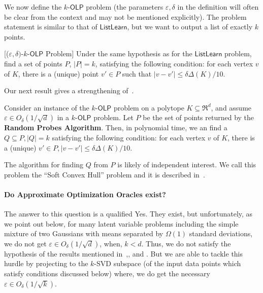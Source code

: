 \documentclass[11pt,letterpaper]{article}
\newcommand{\olp}{{\mathsf {OLP}}\xspace}
\newcommand{\kolp}{k\mbox{-}\olp}
\newcommand{\ListLearn}{\mathsf {ListLearn}\xspace}
\begin{document}
We now define the $\kolp$ problem (the parameters $\varepsilon, \delta$ in the definition will often be clear from the context and may not be mentioned explicitly). The problem statement is similar to that of $\ListLearn$, but we want to output a list of exactly $k$ points. 
\begin{defn}\label{OLP}[($\varepsilon,\delta)$-$\kolp$ Problem]
Under the same hypothesis as for the $\ListLearn$ problem, find  a set of points $P$,  $|P|=k$, satisfying the following condition: for each vertex $v$ of $K$, there is a (unique) point $ v'\in P$ such that  $|v-v'|\leq\delta\Delta(K)/10$.
\end{defn}

Our next result gives a strengthening of~. 
\begin{theorem}\label{kolp-0}
Consider an instance of the $\kolp$ problem on a polytope $K \subseteq \Re^d$, and assume 
$\varepsilon \in O_\delta(1/\sqrt d)$ in a $\kolp$ problem. Let $P$ be the set of points returned by the {\bf Random Probes Algorithm}. Then, in polynomial time, we an find a $Q\subseteq P, |Q|=k$ satisfying the following condition:  for each vertex $v$ of $K$,  there is a (unique) $v'\in P, |v-v'|\leq\delta\Delta(K)/10$.
\end{theorem}

The algorithm for finding $Q$ from $P$ is likely of independent interest. We call this problem the ``Soft Convex Hull'' problem and it is described in~.

\paragraph{Do Approximate Optimization Oracles exist?}
\label{Data-Gen-1}
The answer to this question is a qualified Yes. They exist, but unfortunately, as we point out below,  for many latent variable problems including the simple mixture of two Gaussians with means separated by $\Omega(1)$ standard deviations, we do not get $\varepsilon\in O_\delta(1/\sqrt d)$, when, $k<d$. Thus,  we do not satisfy the hypothesis of the results mentioned in~,, and .  
But we are able to tackle this hurdle by projecting to the $k$-SVD subspace (of the input data points which satisfy conditions discussed below) where, we do get the necessary 
$\varepsilon\in O_\delta(1/\sqrt k)$. 
\end{document}
